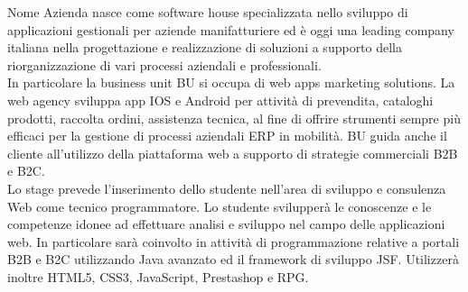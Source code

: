 \documentclass[a4paper]{article}
\begin{document}
Nome Azienda nasce come software house specializzata nello sviluppo di applicazioni gestionali per aziende manifatturiere ed è oggi una leading company italiana nella progettazione e realizzazione di soluzioni a supporto della riorganizzazione di vari processi aziendali e professionali.\\
In particolare la business unit BU si occupa di web apps marketing solutions. La web agency sviluppa app IOS e Android per attività di prevendita, cataloghi prodotti, raccolta ordini, assistenza tecnica, al fine di offrire strumenti sempre più efficaci per la gestione di processi aziendali ERP in mobilità. BU guida anche il cliente all’utilizzo della piattaforma web a supporto di strategie commerciali B2B e B2C.\\

Lo stage prevede l'inserimento dello studente nell'area di sviluppo e consulenza Web come tecnico programmatore. Lo studente svilupperà le conoscenze e le competenze idonee ad effettuare analisi e sviluppo nel campo delle applicazioni web. In particolare sarà coinvolto in attività di programmazione relative a portali B2B e B2C utilizzando Java avanzato ed il framework di sviluppo JSF. Utilizzerà inoltre HTML5, CSS3, JavaScript, Prestashop e RPG.

\clearpage
\end{document}
